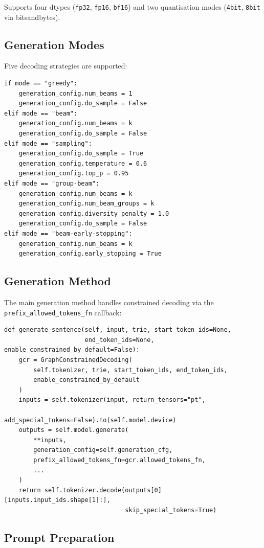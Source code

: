 \documentclass[11pt,a4paper,oneside,openany]{book}
\theoremstyle{definition}
\newcommand{\code}[1]{\texttt{#1}}
\begin{document}
Supports four dtypes (\code{fp32}, \code{fp16}, \code{bf16}) and two quantisation modes (\code{4bit}, \code{8bit} via bitsandbytes).

\subsection{Generation Modes}

Five decoding strategies are supported:

\begin{lstlisting}
if mode == "greedy":
    generation_config.num_beams = 1
    generation_config.do_sample = False
elif mode == "beam":
    generation_config.num_beams = k
    generation_config.do_sample = False
elif mode == "sampling":
    generation_config.do_sample = True
    generation_config.temperature = 0.6
    generation_config.top_p = 0.95
elif mode == "group-beam":
    generation_config.num_beams = k
    generation_config.num_beam_groups = k
    generation_config.diversity_penalty = 1.0
    generation_config.do_sample = False
elif mode == "beam-early-stopping":
    generation_config.num_beams = k
    generation_config.early_stopping = True
\end{lstlisting}

\subsection{Generation Method}

The main generation method handles constrained decoding via the \code{prefix\_allowed\_tokens\_fn} callback:

\begin{lstlisting}
def generate_sentence(self, input, trie, start_token_ids=None,
                      end_token_ids=None, enable_constrained_by_default=False):
    gcr = GraphConstrainedDecoding(
        self.tokenizer, trie, start_token_ids, end_token_ids,
        enable_constrained_by_default
    )
    inputs = self.tokenizer(input, return_tensors="pt",
                            add_special_tokens=False).to(self.model.device)
    outputs = self.model.generate(
        **inputs,
        generation_config=self.generation_cfg,
        prefix_allowed_tokens_fn=gcr.allowed_tokens_fn,
        ...
    )
    return self.tokenizer.decode(outputs[0][inputs.input_ids.shape[1]:],
                                 skip_special_tokens=True)
\end{lstlisting}

\subsection{Prompt Preparation}
\end{document}
